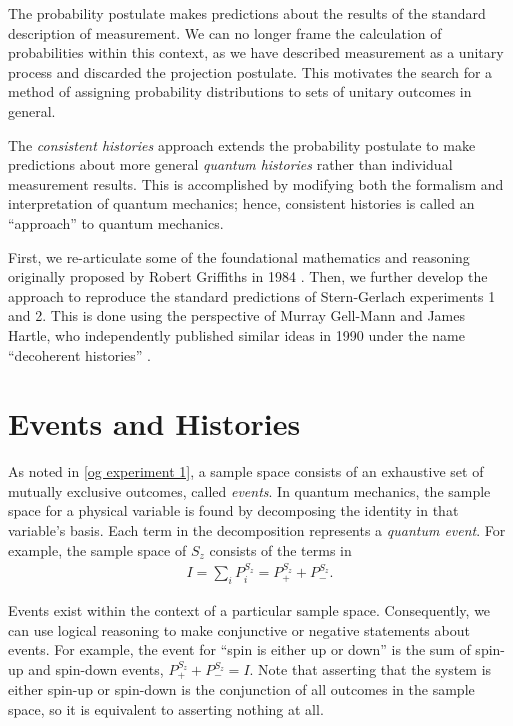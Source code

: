 The probability postulate makes predictions about the results of the standard description of measurement. We can no longer frame the calculation of probabilities within this context, as we have  described measurement as a unitary process and discarded the projection postulate. This motivates the search for a method of assigning probability distributions to sets of unitary outcomes in general.

The \textit{consistent histories} approach extends the probability postulate to make predictions about  more general \textit{quantum histories} rather than individual measurement results. This is accomplished by modifying both the formalism and interpretation of quantum mechanics; hence, consistent histories is called an ``approach'' to quantum mechanics.

First, we re-articulate some of the foundational mathematics and reasoning originally proposed by Robert Griffiths in 1984 \cite{old_griffiths}. Then, we further develop the approach to reproduce the standard predictions of Stern-Gerlach experiments 1 and 2. This is done using the perspective of Murray Gell-Mann and James Hartle, who independently published similar ideas in 1990 under the name ``decoherent histories'' \cite{gell}.

\section{Events and Histories} \label{events}

As noted in \autoref{og experiment 1}, a sample space consists of an exhaustive set of mutually exclusive outcomes, called \textit{events}. In quantum mechanics, the sample space for a physical variable is found by decomposing the identity in that variable's basis. Each term in the decomposition represents a \textit{quantum event}. For example, the sample space of $S_z$ consists of the terms in
\begin{align}
  I = \sum_i P^{S_z}_i = P^{S_z}_+ + P^{S_z}_-.
\end{align}

Events exist within the context of a particular sample space. Consequently, we can use logical reasoning to make conjunctive or negative statements about events. For example, the event for ``spin is either up or down'' is the sum of spin-up and spin-down events, $P^{S_z}_+ + P^{S_z}_- = I$. Note that asserting that the system is either spin-up or spin-down is the conjunction of all outcomes in the sample space, so it is equivalent to asserting nothing at all.

